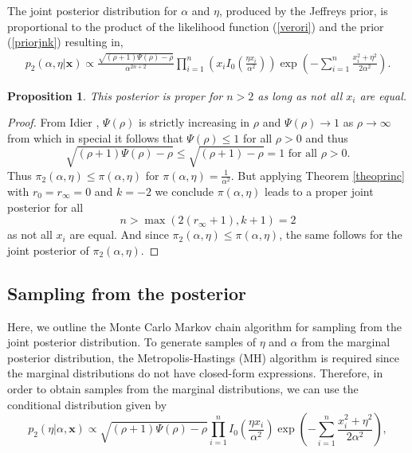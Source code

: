 \documentclass[12pt]{interact}
\theoremstyle{plain}%
\newtheorem{proposition}[theorem]{Proposition}
\theoremstyle{definition}
\theoremstyle{remark}
\begin{document}
The joint posterior distribution for $\alpha$ and $\eta$, produced by the Jeffreys prior, is proportional to the product of the likelihood function (\ref{verori}) and the prior (\ref{priorjnk}) resulting in,
\begin{equation}\label{postjnk1} 
\begin{aligned}
p_2(\alpha,\eta|\boldsymbol{x})\propto\frac{\sqrt{(\rho+1)\Psi(\rho)-\rho}}{\alpha^{2n+2}}\prod_{i=1}^{n}\left(x_iI_0\left( \frac{\eta x_i}{\alpha^2} \right)\right) \exp\left( -\sum_{i=1}^{n}\frac{x_i^2 + \eta^2}{2\alpha^2} \right). 
\end{aligned}
\end{equation}

\begin{proposition}\label{prop2} This posterior is proper for $n> 2$ as long as not all $x_i$ are equal.
\end{proposition}
\begin{proof} From Idier \cite{idier2014properties}, $\Psi(\rho)$ is strictly increasing in $\rho$ and $\Psi(\rho)\to 1$ as $\rho\to \infty$ from which in special it follows that $\Psi(\rho)\leq 1$ for all $\rho>0$ and thus
\begin{equation*}
\sqrt{(\rho+1)\Psi(\rho)-\rho}\leq \sqrt{(\rho+1) - \rho} = 1\mbox{ for all }\rho >0.
\end{equation*}
Thus $\pi_2(\alpha,\eta)\leq \pi(\alpha,\eta)$ for $\pi(\alpha,\eta)=\frac{1}{\alpha^2}$. But applying Theorem \ref{theoprinc} with $r_0=r_\infty=0$ and $k=-2$ we conclude $\pi(\alpha,\eta)$ leads to a proper joint posterior for all
\begin{equation*}n>\max(2(r_\infty+1),k+1)=2
\end{equation*}
as not all $x_i$ are equal. And since $\pi_2(\alpha,\eta)\leq \pi(\alpha,\eta)$, the same follows for the joint posterior of $\pi_2(\alpha,\eta)$.
\end{proof}

\subsection{Sampling from the posterior}\label{secmetrol}

Here, we outline the Monte Carlo Markov chain algorithm for sampling from the joint posterior distribution.  To generate samples of $\eta$ and $\alpha$ from the marginal posterior distribution, the Metropolis-Hastings (MH) algorithm is required since the marginal distributions do not have closed-form expressions. Therefore, in order to obtain samples from the marginal distributions, we can use the conditional distribution given by 
\begin{equation}\label{cond1}
p_2(\eta|\alpha,\boldsymbol{x})\propto \sqrt{(\rho+1)\Psi(\rho)-\rho}\prod_{i=1}^{n}I_0\left( \frac{\eta x_i}{\alpha^2} \right) \exp\left( -\sum_{i=1}^{n}\frac{x_i^2 + \eta^2}{2\alpha^2} \right),\end{equation}
\end{document}
